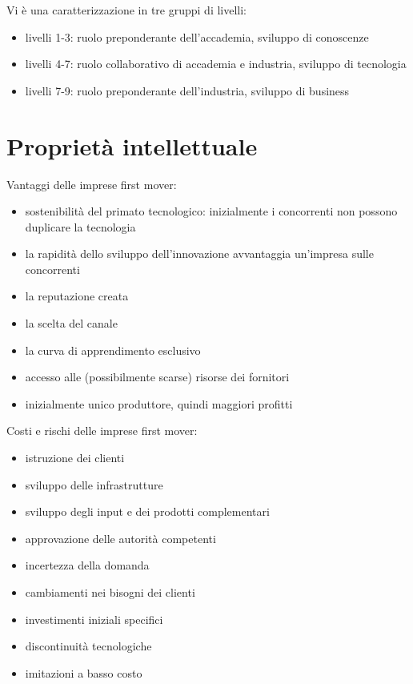 \documentclass[answers, a4paper, 11pt]{exam}
\begin{document}
Vi è una caratterizzazione in tre gruppi di livelli:
\begin{itemize}
    \item livelli 1-3: ruolo preponderante dell'accademia, sviluppo di conoscenze
    \item livelli 4-7: ruolo collaborativo di accademia e industria, sviluppo di tecnologia
    \item livelli 7-9: ruolo preponderante dell'industria, sviluppo di business
\end{itemize}

\section{Proprietà intellettuale}

Vantaggi delle imprese first mover:

\begin{itemize}
    \item sostenibilità del primato tecnologico: inizialmente i concorrenti non possono duplicare la tecnologia
    \item la rapidità dello sviluppo dell'innovazione avvantaggia un'impresa sulle concorrenti
    \item la reputazione creata
    \item la scelta del canale
    \item la curva di apprendimento esclusivo
    \item accesso alle (possibilmente scarse) risorse dei fornitori
    \item inizialmente unico produttore, quindi maggiori profitti
\end{itemize}

Costi e rischi delle imprese first mover:

\begin{itemize}
    \item istruzione dei clienti
    \item sviluppo delle infrastrutture
    \item sviluppo degli input e dei prodotti complementari
    \item approvazione delle autorità competenti
    \item incertezza della domanda
    \item cambiamenti nei bisogni dei clienti
    \item investimenti iniziali specifici
    \item discontinuità tecnologiche
    \item imitazioni a basso costo
\end{itemize}
\end{document}
